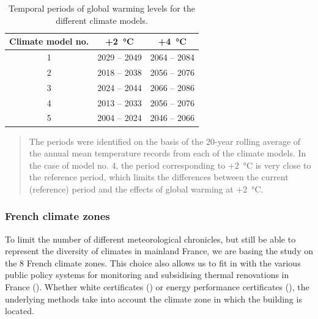 \documentclass[11pt]{article}
\begin{document}
        \begin{table}[ht]
            \centering
            \caption{\label{tab:climate_periods} Temporal periods of global warming levels for the different climate models.}
            \small
            \begin{tabular}{ccc}
                \toprule
                Climate model no. & +\SI{2}{\celsius} & +\SI{4}{\celsius} \\
                \midrule
                1 & 2029 -- 2049 & 2064 -- 2084 \\
                2 & 2018 -- 2038 & 2056 -- 2076 \\
                3 & 2024 -- 2044 & 2066 -- 2086 \\
                4 & 2013 -- 2033 & 2056 -- 2076 \\
                5 & 2004 -- 2024 & 2046 -- 2066 \\
                \bottomrule
                \end{tabular}
            \begin{quote}
                \small\noindent
                The periods were identified on the basis of the 20-year rolling average of the annual mean temperature records from each of the climate models. In the case of model no. 4, the period corresponding to +\SI{2}{\celsius} is very close to the reference period, which limits the differences between the current (reference) period and the effects of global warming at +\SI{2}{\celsius}.
            \end{quote}
        \end{table}


        \subsubsection{French climate zones} %
        \label{ssub:french_climate_zones}

        To limit the number of different meteorological chronicles, but still be able to represent the diversity of climates in mainland France, we are basing the study on the 8 French climate zones. This choice also allows us to fit in with the various public policy systems for monitoring and subsidising thermal renovations in France (\cite{anah_aides_2024}). Whether white certificates (\cite{ademe_french_2011}) or energy performance certificates (\cite{ministere_de_la_transition_ecologique_methode_2021}), the underlying methods take into account the climate zone in which the building is located. \\
\end{document}
